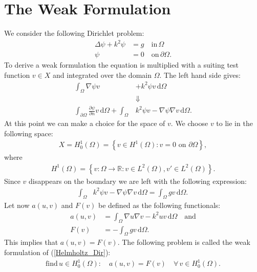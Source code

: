 \documentclass[10pt,a4paper]{article}
\begin{document}
\section*{The Weak Formulation}
We consider the following Dirichlet problem:
\begin{equation}
\begin{aligned}
\label{Helmholtz_Dir}
\Delta \psi + k^2 \psi &= g  \quad \text{in} \, \Omega \\
\psi &= 0 \quad \text{on} \, \partial \Omega.
\end{aligned}
\end{equation}
To derive a weak formulation the equation is multiplied with a suiting test function $v \in X $ and integrated over the domain $\Omega$. The left hand side gives:
\begin{align*}
\int_\Omega \nabla \psi v &+ k^2 \psi v \, \mathrm{d} \Omega \\
&\Downarrow \\
\int_{\partial \Omega} \frac{\partial \psi}{\partial n} v \, \mathrm{d} \Omega + \int_\Omega & k^2 \psi v - \nabla \psi \nabla v \, \mathrm{d} \Omega.
\end{align*}
At this point we can make a choice for the space of $v$. We choose $v$ to lie in the following space:
\begin{align*}
X = H^1_0(\Omega) = \left\{ v \in H^1(\Omega) : v = 0 \text{ on }   \partial \Omega \right\},
\end{align*}
where
\begin{align*}
H^1(\Omega) = \left\{ v: \Omega \rightarrow \mathbb{R}: v \in L^2(\Omega), v' \in L^2(\Omega) \right\}.
\end{align*}
Since $v$ disappears on the boundary we are left with the following expression:
\begin{align*}
\int_\Omega & k^2 \psi v - \nabla \psi \nabla v \, \mathrm{d} \Omega = \int_\Omega gv \, \mathrm{d} \Omega.
\end{align*}
Let now $a(u,v)$ and $F(v)$ be defined as the following functionals:
\begin{align*}
a(u,v) &= \int_\Omega  \nabla u \nabla v - k^2 u v  \, \mathrm{d} \Omega  \quad \text{and} \\
F(v) &= - \int_\Omega gv \, \mathrm{d} \Omega.
\end{align*}
This implies that $a(u,v) = F(v)$. The following problem is called the weak formulation of (\ref{Helmholtz_Dir}):
\begin{equation}
\begin{aligned}
\label{Helmholtz_weak}
\text{find} \, u \in H^1_0(\Omega): \quad a(u,v) = F(v) \quad \forall \, v \in H^1_0(\Omega).
\end{aligned}
\end{equation}
\end{document}
